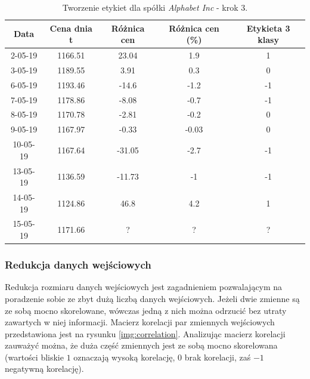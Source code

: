\documentclass[a4paper, twoside, 11pt, openright]{article}
\begin{document}
 \begin{table}[H]
    \centering
    \begin{tabular}{|c|c|c|c|c|}
    \hline
        \textbf{Data}  & \textbf{Cena dnia t} & \textbf{Różnica cen} & \textbf{Różnica cen (\%)}  & \textbf{Etykieta 3 klasy} \\ \hline
            2-05-19 & 1166.51 & 23.04 & 1.9 & 1 \\ \hline
            3-05-19 & 1189.55 & 3.91 & 0.3 & 0 \\ \hline
            6-05-19 & 1193.46 &  -14.6 & -1.2 & -1 \\ \hline
            7-05-19 & 1178.86 &  -8.08 & -0.7 & -1 \\ \hline
            8-05-19 & 1170.78 & -2.81 & -0.2 & 0 \\ \hline
            9-05-19 & 1167.97 &  -0.33 & -0.03 & 0 \\ \hline
            10-05-19 & 1167.64 &  -31.05 & -2.7 & -1 \\ \hline
            13-05-19 & 1136.59 &  -11.73 & -1 & -1 \\ \hline
            14-05-19 & 1124.86 &  46.8 & 4.2 & 1 \\ \hline 
            15-05-19 & 1171.66 & ? & ? & ? \\ \hline
    \end{tabular}
    \caption{Tworzenie etykiet dla spółki \textit{Alphabet Inc} - krok 3.}
    \label{tab:classification_label_creation}
\end{table} 

\subsubsection{Redukcja danych wejściowych}

Redukcja rozmiaru danych wejściowych jest zagadnieniem pozwalającym na poradzenie sobie ze zbyt dużą liczbą danych wejściowych. Jeżeli dwie zmienne są ze sobą mocno skorelowane, wówczas jedną z nich można odrzucić bez utraty zawartych w niej informacji. Macierz korelacji par zmiennych wejściowych przedstawiona jest na rysunku \ref{img:correlation}. Analizując macierz korelacji zauważyć można, że duża część zmiennych jest ze sobą mocno skorelowana (wartości bliskie $1$ oznaczają wysoką korelację, 0 brak korelacji, zaś $-1$ negatywną korelację).
\end{document}
